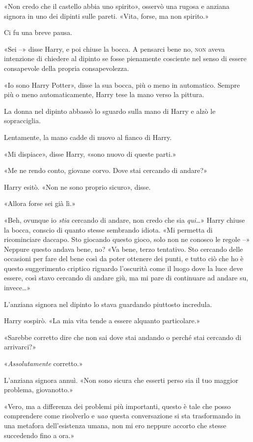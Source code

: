 «Non credo che il castello abbia uno spirito», osservò una rugosa e anziana signora in uno dei dipinti sulle pareti. «Vita, forse, ma non spirito.»

Ci fu una breve pausa.

«Sei –» disse Harry, e poi chiuse la bocca. A pensarci bene no, \textsc{non} aveva intenzione di chiedere al dipinto se fosse pienamente cosciente nel senso di essere consapevole della propria consapevolezza.

«Io sono Harry Potter», disse la sua bocca, più o meno in automatico. Sempre più o meno automaticamente, Harry tese la mano verso la pittura.

La donna nel dipinto abbassò lo sguardo sulla mano di Harry e alzò le sopracciglia.

Lentamente, la mano cadde di nuovo al fianco di Harry.

«Mi dispiace», disse Harry, «sono nuovo di queste parti.»

«Me ne rendo conto, giovane corvo. Dove stai cercando di andare?»

Harry esitò. «Non ne sono proprio sicuro», disse.

«Allora forse sei già lì.»

«Beh, ovunque io \textit{stia} cercando di andare, non credo che sia \textit{qui}…» Harry chiuse la bocca, conscio di quanto stesse sembrando idiota. «Mi permetta di ricominciare daccapo. Sto giocando questo gioco, solo non ne conosco le regole –» Neppure questo andava bene, no? «Va bene, terzo tentativo. Sto cercando delle occasioni per fare del bene così da poter ottenere dei punti, e tutto ciò che ho è questo suggerimento criptico riguardo l’oscurità come il luogo dove la luce deve essere, così stavo cercando di andare giù, ma mi pare di continuare ad andare su, invece…»

L’anziana signora nel dipinto lo stava guardando piuttosto incredula.

Harry sospirò. «La mia vita tende a essere alquanto particolare.»

«Sarebbe corretto dire che non sai dove stai andando o perché stai cercando di arrivarci?»

«\textit{Assolutamente} corretto.»

L’anziana signora annuì. «Non sono sicura che esserti perso sia il tuo maggior problema, giovanotto.»

«Vero, ma a differenza dei problemi più importanti, questo è tale che posso comprendere come risolverlo e \textit{uao} questa conversazione si sta trasformando in una metafora dell’esistenza umana, non mi ero neppure accorto che stesse succedendo fino a ora.»

